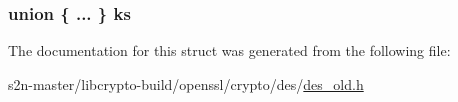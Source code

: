 \subsubsection[{\texorpdfstring{ks}{ks}}]{\setlength{\rightskip}{0pt plus 5cm}union \{ ... \}   ks}\hypertarget{struct__ossl__old__des__ks__struct_a1eb11730d530220c7dbeefefbbc0dd9c}{}\label{struct__ossl__old__des__ks__struct_a1eb11730d530220c7dbeefefbbc0dd9c}


The documentation for this struct was generated from the following file\+:\begin{DoxyCompactItemize}
\item 
s2n-\/master/libcrypto-\/build/openssl/crypto/des/\hyperlink{crypto_2des_2des__old_8h}{des\+\_\+old.\+h}\end{DoxyCompactItemize}
